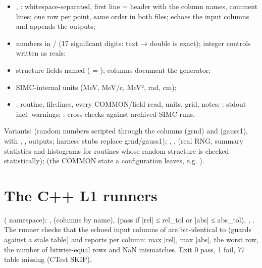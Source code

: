 \begin{itemize}
\item {}, : whitespace-separated,\allowbreak{} first line = header with the column names, \code{\#} comment lines; one row
per point, same order in both files;  echoes the input columns and appends the outputs;
\item numbers in  /  (17 significant digits: text → double is exact); integer controls written as reals;
\item structure fields named  ( = );  columns document the generator;
\item SIMC-internal units (MeV, MeV/c, MeV², rad, cm);
\item {}: routine, file:lines, every COMMON/\allowbreak{}field read, units, grid, notes; : stdout incl. warnings;
: cross-checks against archived SIMC runs.
\end{itemize}
Variants:  (random numbers scripted through the columns  (grnd) and  (gauss1),
with , ,  outputs; harness stubs  replace grnd/\allowbreak{}gauss1);
, ,  (real RNG, summary statistics and histograms for routines whose
random structure is checked statistically);  (the COMMON state a configuration leaves, e.g. ).

\section{\texorpdfstring{The C++ L1 runners}{The C++ L1 runners}}\label{translation_report-02u5fvalidation:22-the-c-l1-runners}
 ( namespace): ,  (columns by name),  (pass if |rel| ≤ rel\_tol or |abs| ≤ abs\_tol), , . The runner checks
that the echoed input columns of  are bit-identical to  (guards against a stale table) and
reports per column: max |rel|, max |abs|, the worst row, the number of bitwise-equal rows and NaN mismatches. Exit 0
pass, 1 fail, 77 table missing (CTest SKIP).

